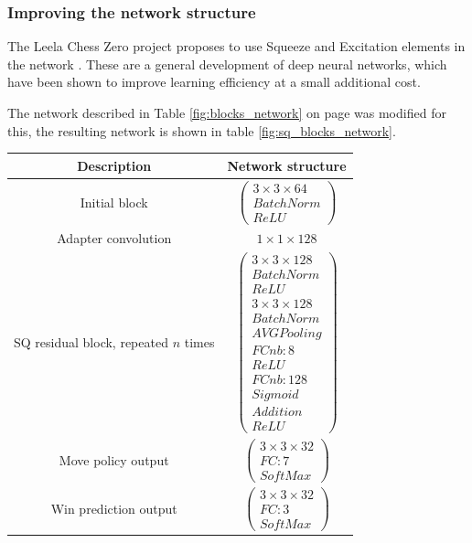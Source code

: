 \documentclass[12pt,onecolumn,oneside,titlepage]{article}
\begin{document}
\subsubsection{Improving the network structure}

The Leela Chess Zero project \cite{leela0sq} proposes to use Squeeze and Excitation elements in the network \cite{hu2018squeeze}.
These are a general development of deep neural networks, which have been shown to improve learning efficiency at a small additional cost.

The network described in Table \ref{fig:blocks_network} on page \pageref{fig:blocks_network} was modified for this, the resulting network is shown in table \ref{fig:sq_blocks_network}.

\begin{table} [H]
 \centering
  \begin{tabular}{c | c }
   Description & Network structure \\
   \hline
   \hline
   Initial block & $\begin{pmatrix} 3 \times 3 \times 64 \\ BatchNorm \\ ReLU \end{pmatrix}$ \\
   \hline
   Adapter convolution & $1 \times 1 \times 128$ \\
   \hline
   SQ residual block, repeated $n$ times & $\begin{pmatrix} 3 \times 3 \times 128 \\ BatchNorm \\ ReLU \\ 3 \times 3 \times 128 \\ BatchNorm \\ AVG Pooling \\ FCnb: 8 \\ ReLU \\ FCnb: 128 \\ Sigmoid \\ Addition \\ ReLU \end{pmatrix}$ \\
   \hline 
   Move policy output & $\begin{pmatrix} 3 \times 3 \times 32 \\ FC: 7 \\ SoftMax \end{pmatrix}$ \\
   \hline
   Win prediction output & $\begin{pmatrix} 3 \times 3 \times 32 \\ FC: 3 \\ SoftMax \end{pmatrix}$

\end{tabular}
\end{table}
\end{document}

